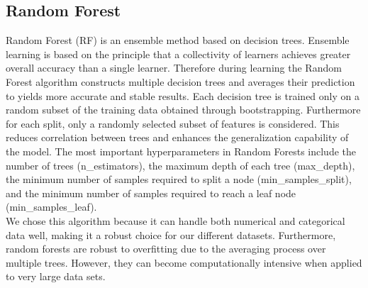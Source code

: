 \documentclass{article}
\begin{document}
\subsection{Random Forest}
Random Forest (RF) is an ensemble method based on decision trees. Ensemble learning is based on the principle that a collectivity of learners achieves greater overall accuracy than a single learner. Therefore during learning the Random Forest algorithm constructs multiple decision trees and averages their prediction to yields more accurate and stable results. Each decision tree is trained only on a random subset of the training data obtained through bootstrapping. Furthermore for each split, only a randomly selected subset of features is considered. This reduces correlation between trees and enhances the generalization capability of the model. The most important hyperparameters in Random Forests include the number of trees (n\_estimators), the maximum depth of each tree (max\_depth), the minimum number of samples required to split a node (min\_samples\_split), and the minimum number of samples required to reach a leaf node (min\_samples\_leaf).
\\
We chose this algorithm because it can handle both numerical and categorical data well, making it a robust choice for our different datasets. Furthermore, random forests are robust to overfitting due to the averaging process over multiple trees. However, they can become computationally intensive when applied to very large data sets.
\end{document}
